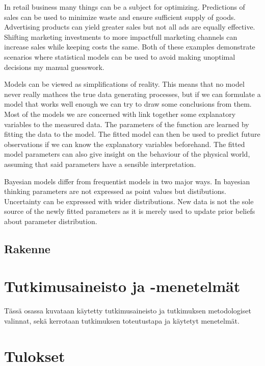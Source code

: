 \documentclass[english, 12pt, a4paper, sci, utf8, a-1b, online]{aaltothesis}
\begin{document}
In retail business many things can be a subject for optimizing. Predictions of sales can be used
to minimize waste and ensure sufficient supply of goods. Advertising products can yield greater sales
but not all ads are equally effective. Shifting marketing investments to more impactfull marketing channels
can increase sales while keeping costs the same. Both of these examples demonstrate scenarios where statistical models can be used to
avoid making unoptimal decisions my manual guesswork.

Models can be viewed as simplifications of reality. This means that no model never really mathces the true data generating processes, 
but if we can formulate a model that works well enough we can try to draw some conclusions from them. Most of the models we are concerned with
link together some explanatory variables to the measured data. The parameters of the function are learned by fitting the data to the model.
The fitted model can then be used to predict future observations if we can know the explanatory variables beforehand. The fitted model parameters
can also give insight on the behaviour of the physical world, assuming that said parameters have a sensible interpretation.

Bayesian models differ from frequentist models in two major ways. In bayesian thinking parameters are not expressed as point values but distibutions.
Uncertainty can be expressed with wider distributions. New data is not the sole source of the newly fitted parameters as it is merely used to
update prior beliefs about parameter distribution. 






\subsection{Rakenne}

\section{Tutkimusaineisto ja -menetelmät}

Tässä osassa kuvataan käytetty tutkimusaineisto ja tutkimuksen metodologiset
valinnat, sekä kerrotaan tutkimuksen toteutustapa ja käytetyt menetelmät.


\section{Tulokset}
\end{document}
